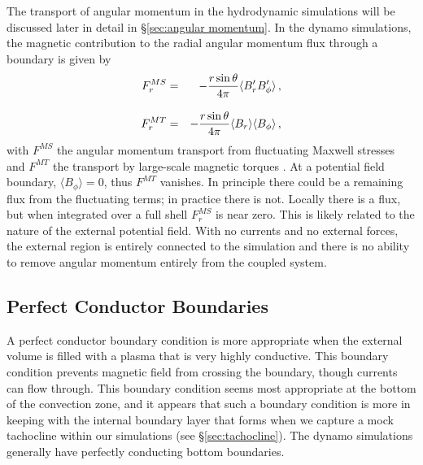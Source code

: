 
The transport of angular momentum 
in the hydrodynamic simulations will be discussed later in detail in \S\ref{sec:angular  momentum}.  
In the dynamo simulations, the magnetic contribution to the radial angular momentum flux through
a boundary is given by
\begin{eqnarray}
  F^{MS}_r &=& - \frac{r \sin \theta}{4 \pi} \langle B_r' B_\phi' \rangle\thinspace, \\[3mm] 
  F^{MT}_r &=& - \frac{r \sin \theta}{4 \pi} \langle B_r\rangle \langle B_\phi \rangle\thinspace,
\end{eqnarray}
with $F^{MS}$ the angular momentum transport from fluctuating Maxwell
stresses and $F^{MT}$ the transport by large-scale magnetic torques \citep{Brun_et_al_2004, Brun_et_al_2005}.
At a potential field boundary, $\langle B_\phi \rangle = 0$, thus $F^{MT}$
vanishes.  In principle there could be a remaining flux from the
fluctuating terms; in practice there is not.  Locally there is a flux,
but when integrated over a full shell $F^{MS}_r$ is near zero.  This
is likely related to the nature of the external potential field.  With
no currents and no external forces, the external region is entirely
connected to the simulation and there is no ability to remove
angular momentum entirely from the coupled system.

\clearpage
\subsection{Perfect Conductor Boundaries}

A perfect conductor boundary condition is more appropriate when the
external volume is filled with a plasma that is very highly
conductive.  This boundary condition prevents magnetic field from
crossing the boundary, though currents can flow through.  This
boundary condition seems most appropriate at the bottom of the
convection zone, and it appears that such a boundary condition is more in keeping with the
internal boundary layer that forms when we capture a mock tachocline
within our simulations (see \S\ref{sec:tachocline}).  The dynamo simulations generally have
perfectly conducting bottom boundaries.

